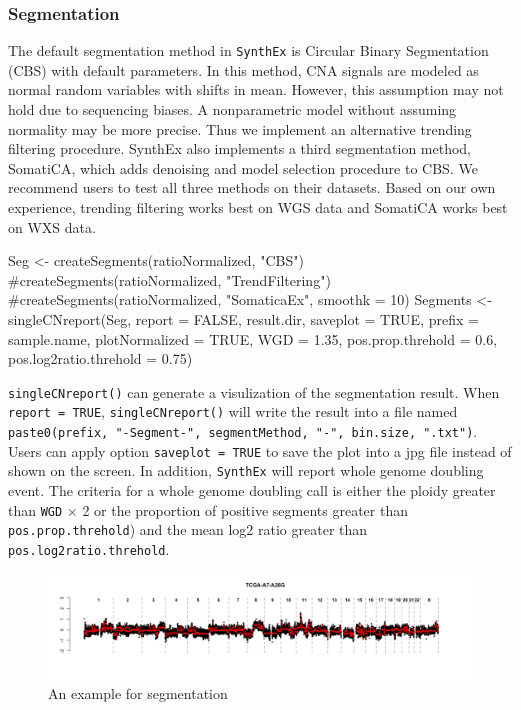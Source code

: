 \documentclass{article}
\newcommand{\code}[1]{\texttt{#1}}
\begin{document}
\subsubsection{Segmentation}

The default segmentation method in \code{SynthEx} is Circular Binary Segmentation (CBS) with default parameters. In this method, CNA signals are modeled as normal random variables with shifts in mean. However, this assumption may not hold due to sequencing biases. A nonparametric model without assuming normality may be more precise. Thus we implement an alternative trending filtering procedure. SynthEx also implements a third segmentation method, SomatiCA, which adds denoising and model selection procedure to CBS. We recommend users to test all three methods on their datasets. Based on our own experience, trending filtering works best on WGS data and SomatiCA works best on WXS data.
\begin{Schunk}
\begin{Sinput}
 Seg <- createSegments(ratioNormalized, "CBS")
 #createSegments(ratioNormalized, "TrendFiltering")
 #createSegments(ratioNormalized, "SomaticaEx", smoothk = 10)
 Segments <- singleCNreport(Seg, report = FALSE,
    result.dir, saveplot = TRUE,
    prefix = sample.name, plotNormalized = TRUE,
    WGD = 1.35, pos.prop.threhold = 0.6,
    pos.log2ratio.threhold = 0.75)
\end{Sinput}
\end{Schunk}
\code{singleCNreport()} can generate a visulization of the segmentation result. When \code{report = TRUE}, \code{singleCNreport()} will write the result into a file named \code{paste0(prefix, "-Segment-", segmentMethod, "-", bin.size, ".txt")}. Users can apply option \code{saveplot = TRUE} to save the plot into a jpg file instead of shown on the screen. In addition, \code{SynthEx} will report whole genome doubling event. The criteria for a whole genome doubling call is either the ploidy greater than \code{WGD} $\times$ 2 or the proportion of positive segments greater than \code{pos.prop.threhold}) and the mean log2 ratio greater than \code{pos.log2ratio.threhold}.


\begin{figure}
\begin{center}
\includegraphics[width=\textwidth]{figure/seg1-1}
\end{center}
\caption{An example for segmentation}
\label{segmentation}
\end{figure}
\end{document}
